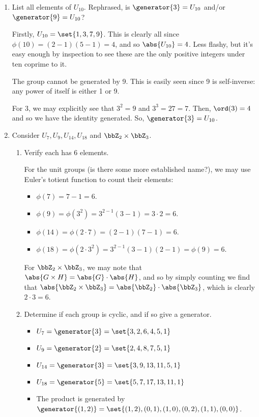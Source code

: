 \documentclass{article}
\begin{document}
\begin{enumerate}
  \item List all elements of $U_{10}$. Rephrased, is $\generator{3} = U_{10}$ and/or $\generator{9} = U_{10}$?

        Firstly, $U_{10} = \set{1, 3, 7, 9}$.
        This is clearly all since $\phi(10) = (2 - 1)(5 - 1) = 4$, and so $\abs{U_{10}} = 4$.
        Less flashy, but it's easy enough by inspection to see these are the only positive integers
        under ten coprime to it.

        The group cannot be generated by 9.
        This is easily seen since 9 is self-inverse: any power of itself is either 1 or 9.

        For 3, we may explicitly see that $3^{2} = 9$ and $3^{3} = 27 = 7$. Then, $\ord(3) = 4$ and
        so we have the identity generated. So, $\generator{3} = U_{10}$.

  \item Consider $U_{7}, U_{9}, U_{14}, U_{18}$ and $\bbZ_{2} \times \bbZ_{3}$.
        \begin{enumerate}
          \item Verify each has 6 elements.

                For the unit groups (is there some more established name?),
                we may use Euler's totient function to count their elements:
                \begin{itemize}
                  \item $\phi(7) = 7 - 1 = 6$.
                  \item $\phi(9) = \phi(3^{2}) = 3^{2 - 1}(3 - 1) = 3 \cdot 2 = 6$.
                  \item $\phi(14) = \phi(2 \cdot 7) = (2 - 1)(7 - 1) = 6$.
                  \item $\phi(18) = \phi(2 \cdot 3^{2}) = 3^{2 - 1}(3 - 1)(2 - 1) = \phi(9) = 6$.
                \end{itemize}
                For $\bbZ_{2} \times \bbZ_{3}$, we may note that $\abs{G \times H} = \abs{G} \cdot \abs{H}$, and so by
                simply counting we find that $\abs{\bbZ_{2} \times \bbZ_{3}} = \abs{\bbZ_{2}} \cdot \abs{\bbZ_{3}}$, which
                is clearly $2 \cdot 3 = 6$.

          \item Determine if each group is cyclic, and if so give a generator.

                \begin{itemize}
                  \item $U_{7} = \generator{3} = \set{3, 2, 6, 4, 5, 1}$
                  \item $U_{9} = \generator{2} = \set{2, 4, 8, 7, 5, 1}$
                  \item $U_{14} = \generator{3} = \set{3, 9, 13, 11, 5, 1}$
                  \item $U_{18} = \generator{5} = \set{5, 7, 17, 13, 11, 1}$
                  \item The product is generated by
                        $\generator{(1, 2)} = \set{(1, 2), (0, 1), (1, 0), (0, 2), (1, 1), (0, 0)}$.
                \end{itemize}


\end{enumerate}
\end{enumerate}
\end{document}
